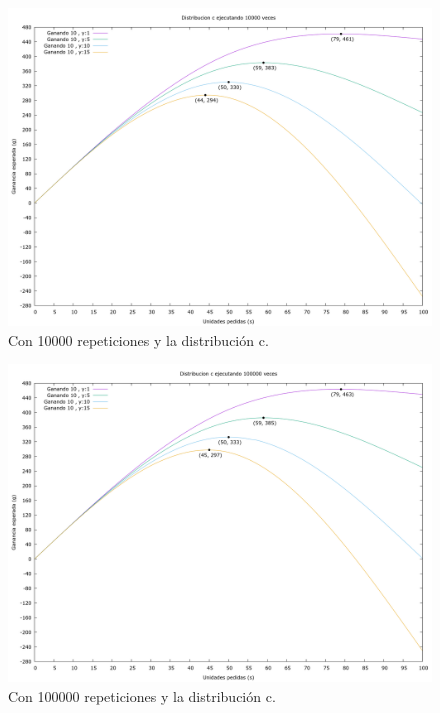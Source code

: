 \documentclass[12pt, spanish]{article}
\begin{document}
\begin{figure}[H]
	\centering
	\includegraphics[scale = 0.2]{prob_c/datos_c_10000.png}
	\caption{Con 10000 repeticiones y la distribución c.}
	\label{fig:ej1_a_10000}

\end{figure}

\begin{figure}[H]
	\centering
	\includegraphics[scale = 0.2]{prob_c/datos_c_100000.png}
	\caption{Con 100000 repeticiones y la distribución c.}
	\label{fig:ej1_a_100000}

\end{figure}
\end{document}
